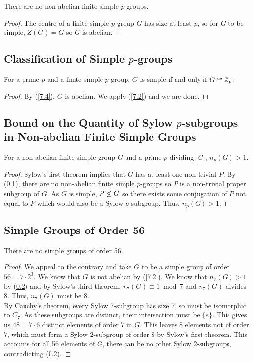 There are no non-abelian finite simple $p$-groups.

\begin{proof}
    The centre of a finite simple $p$-group $G$ has
    size at least $p$, so for $G$ to be simple, $Z(G) = G$
    so $G$ is abelian.
\end{proof}

\subsection{Classification of Simple $p$-groups} \label{7.5}

For a prime $p$ and a finite simple $p$-group, $G$ is simple
if and only if $G \cong \mathbb{Z}_p$.

\begin{proof}
    By (\ref{7.4}), $G$ is abelian. We apply (\ref{7.2}) and
    we are done.
\end{proof}

\subsection{Bound on the Quantity of Sylow $p$-subgroups 
in Non-abelian Finite Simple Groups} \label{7.6}

For a non-abelian finite simple group $G$ and a prime
$p$ dividing $|G|$, $n_p(G) > 1$.

\begin{proof}
    Sylow's first theorem implies that $G$ has at least one
    non-trivial \Syls $P$. By (\ref{7.5}), there are no
    non-abelian finite simple $p$-groups so $P$ is a
    non-trivial proper subgroup of $G$.
    As $G$ is simple, $P \not\trianglelefteq G$ so there exists
    some conjugation of $P$ not equal to $P$ which would
    also be a Sylow $p$-subgroup.
    Thus, $n_p(G) > 1$. 
\end{proof}

\subsection{Simple Groups of Order 56} \label{7.7}

There are no simple groups of order 56.

\begin{proof}
    We appeal to the contrary and take $G$ to be a simple
    group of order $56 = 7 \cdot 2^3$. We know that $G$
    is not abelian by (\ref{7.2}). We know that $n_7(G) > 1$
    by (\ref{7.6}) and by Sylow's third theorem, 
    $n_7(G) \equiv 1 \bmod 7$ and $n_7(G)$ divides 8.
    Thus, $n_7(G)$ must be 8.
    \\[\baselineskip]
    By Cauchy's theorem, every Sylow 7-subgroup has size 7,
    so must be isomorphic to $C_7$. As these subgroups
    are distinct, their intersection must be $\{e\}$.
    This gives us $48 = 7 \cdot 6$ distinct elements of
    order 7 in $G$. This leaves 8 elements not of order $7$,
    which must form a Sylow 2-subgroup of order $8$ by Sylow's
    first theorem. This accounts for all 56 elements of $G$,
    there can be no other Sylow 2-subgroups, contradicting
    (\ref{7.6}).
\end{proof}
